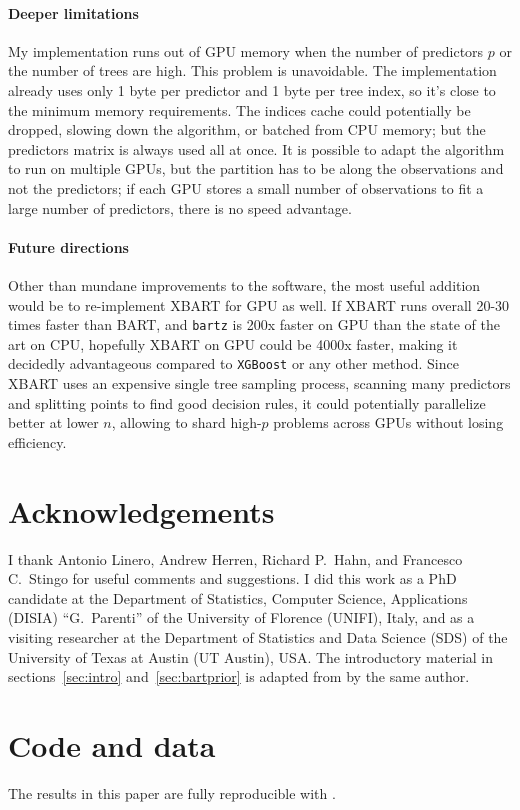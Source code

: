 \documentclass{article}
\begin{document}
    \paragraph{Deeper limitations}

    My implementation runs out of GPU memory when the number of predictors $p$ or the number of trees are high. This problem is unavoidable. The implementation already uses only 1 byte per predictor and 1 byte per tree index, so it's close to the minimum memory requirements. The indices cache could potentially be dropped, slowing down the algorithm, or batched from CPU memory; but the predictors matrix is always used all at once. It is possible to adapt the algorithm to run on multiple GPUs, but the partition has to be along the observations and not the predictors; if each GPU stores a small number of observations to fit a large number of predictors, there is no speed advantage.

    \paragraph{Future directions}

    Other than mundane improvements to the software, the most useful addition would be to re-implement XBART \autocite{he2021} for GPU as well. If XBART runs overall 20-30 times faster than BART, and \texttt{bartz} is 200x faster on GPU than the state of the art on CPU, hopefully XBART on GPU could be 4000x faster, making it decidedly advantageous compared to \texttt{XGBoost} or any other method. Since XBART uses an expensive single tree sampling process, scanning many predictors and splitting points to find good decision rules, it could potentially parallelize better at lower $n$, allowing to shard high-$p$ problems across GPUs without losing efficiency.

    \section*{Acknowledgements}

    I thank Antonio Linero, Andrew Herren, Richard P.\ Hahn, and Francesco C.\ Stingo for useful comments and suggestions. I did this work as a PhD candidate at the Department of Statistics, Computer Science, Applications (DISIA) ``G.~Parenti'' of the University of Florence (UNIFI), Italy, and as a visiting researcher at the Department of Statistics and Data Science (SDS) of the University of Texas at Austin (UT Austin), USA. The introductory material in sections~\ref{sec:intro} and~\ref{sec:bartprior} is adapted from \textcite{petrillo2024f} by the same author.

    \section*{Code and data}

    The results in this paper are fully reproducible with \textcite{petrillo2024e}.

    \printbibliography
\end{document}
